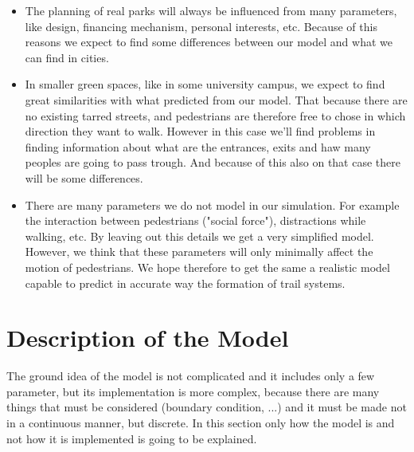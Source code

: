 \documentclass[11pt]{article}
\begin{document}
\begin{itemize}
\item The planning of real parks will always be influenced from many parameters, like design, financing mechanism, personal interests, etc. Because of this reasons we expect to find some differences between our model and what we can find in cities. 
\item In smaller green spaces, like in some university campus, we expect to find great similarities with what predicted from our model. That because there are no existing tarred streets, and pedestrians are therefore free to chose in which direction they want to walk. 
However in this case we'll find problems in finding information about what are the entrances, exits and haw many peoples are going to pass trough. And because of this also on that case there will be some differences. 
\item There are many parameters we do not model in our simulation. For example the interaction between pedestrians ("social force"), distractions while walking, etc. By leaving out this details we get a very simplified model. However, we think that these parameters will only minimally affect the motion of pedestrians. We hope therefore to get the same a realistic model capable to predict in accurate way the formation of trail systems. 
\end{itemize}

\newpage

\section{Description of the Model}

The ground idea of the model is not complicated and it includes only a few parameter, but its implementation is more complex, because there are many things that must be considered (boundary condition, ...) and it must be made not in a continuous manner, but discrete. In this section only how the model is and not how it is implemented is going to be explained.
\end{document}
